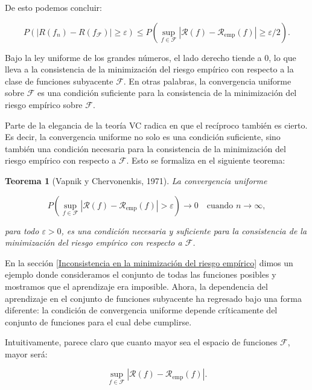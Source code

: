 \documentclass{report}
\newtheorem{thm}{Teorema}[section]
\begin{document}
De esto podemos concluir:

\[
P\left(|R(f_n) - R(f_\mathcal{F})| \geq \varepsilon \right) \leq P\left(\sup_{f \in \mathcal{F}} |\mathcal{R}(f) - \mathcal{R}_{\text{emp}}(f)| \geq \varepsilon/2\right).
\]

Bajo la ley uniforme de los grandes números, el lado derecho tiende a \(0\), lo que lleva a la consistencia de 
la minimización del riesgo empírico con respecto a la clase de funciones subyacente \(\mathcal{F}\). En otras palabras, 
la convergencia uniforme sobre \(\mathcal{F}\) es una condición suficiente para la consistencia de la minimización del 
riesgo empírico sobre \(\mathcal{F}\).\newline

Parte de la elegancia de la teoría VC radica en que el recíproco también es cierto. Es decir, 
la convergencia uniforme no solo es una condición suficiente, sino también una condición necesaria para la 
consistencia de la minimización del riesgo empírico con respecto a \(\mathcal{F}\). Esto se formaliza en el siguiente 
teorema:\newline

\begin{thm}[Vapnik y Chervonenkis, 1971]
La convergencia uniforme
    
    \[
        P\left(\sup_{f \in \mathcal{F}} |\mathcal{R}(f) - \mathcal{R}_{\text{emp}}(f)| > \varepsilon \right) \to 0 \quad \text{cuando } n \to \infty, 
        \]
        
        para todo \(\varepsilon > 0\), es una condición necesaria y suficiente para la consistencia de la minimización del 
        riesgo empírico con respecto a \(\mathcal{F}\).\newline
\end{thm}
        
En la sección \ref{Inconsistencia en la minimización del riesgo empírico} dimos un ejemplo donde consideramos el conjunto de todas las funciones posibles y mostramos 
que el aprendizaje era imposible. Ahora, la dependencia del aprendizaje en el conjunto de funciones subyacente 
ha regresado bajo una forma diferente: la condición de convergencia uniforme depende críticamente del conjunto 
de funciones para el cual debe cumplirse.\newline

Intuitivamente, parece claro que cuanto mayor sea el espacio de funciones \(\mathcal{F}\), mayor será:

\[
\sup_{f \in \mathcal{F}} |\mathcal{R}(f) - \mathcal{R}_{\text{emp}}(f)|.
\]
\end{document}
